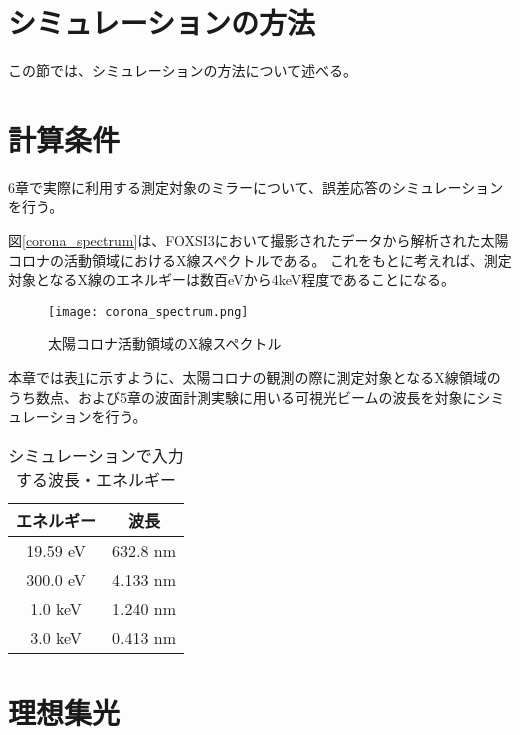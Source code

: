 \section{シミュレーションの方法}
この節では、シミュレーションの方法について述べる。


\clearpage
\newpage

\section{計算条件}
6章で実際に利用する測定対象のミラーについて、誤差応答のシミュレーションを行う。

図\ref{corona_spectrum}は、FOXSI3において撮影されたデータから解析された太陽コロナの活動領域におけるX線スペクトルである。\cite{2019AGUFMSH31C3315V}
これをもとに考えれば、測定対象となるX線のエネルギーは数百eVから4keV程度であることになる。

\begin{figure}[ht]
\centering
\texttt{[image: corona\_spectrum.png]}
\caption{太陽コロナ活動領域のX線スペクトル}
\label{fig:corona_spectrum}
\end{figure}

本章では表\ref{tb:simulation_target_energy}に示すように、太陽コロナの観測の際に測定対象となるX線領域のうち数点、および5章の波面計測実験に用いる可視光ビームの波長を対象にシミュレーションを行う。

\begin{table}[!ht]
\begin{center}
  \begin{tabular}{|c|c|} \hline
    エネルギー & 波長 \\ \hline
    19.59 eV & 632.8 nm \\
    300.0 eV & 4.133 nm  \\
    1.0 keV & 1.240 nm  \\
    3.0 keV & 0.413 nm  \\ \hline
  \end{tabular}
  \caption{シミュレーションで入力する波長・エネルギー}
  \label{tb:simulation_target_energy}
\end{center}
\end{table}

\clearpage
\newpage

\section{理想集光}

